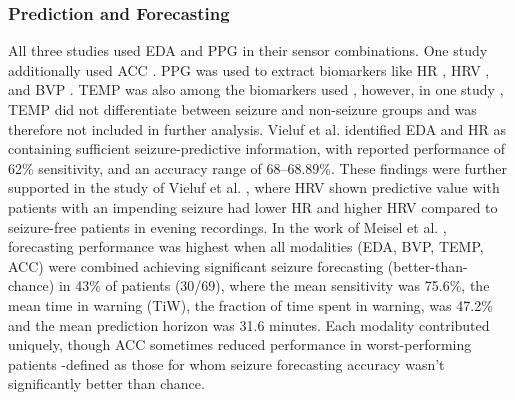 \subsubsection{Prediction and Forecasting}
All three studies used EDA and PPG in their sensor combinations. One study additionally used ACC \cite{Meisel2020-ii}. PPG was used to extract biomarkers like HR \cite{Vieluf2023-ta,Vieluf2023-zv}, HRV \cite{Vieluf2023-zv}, and BVP \cite{Meisel2020-ii}. TEMP was also among the biomarkers used \cite{Vieluf2023-zv,Meisel2020-ii}, however, in one study \cite{Vieluf2023-zv}, TEMP did not differentiate between seizure and non-seizure groups and was therefore not included in further analysis. Vieluf et al. \cite{Vieluf2023-ta,Vieluf2023-zv} identified EDA and HR as containing sufficient seizure-predictive information, with reported performance of 62\% sensitivity, and an accuracy range of 68–68.89\%. These findings were further supported in the study of Vieluf et al. \cite{Vieluf2023-zv} , where HRV shown predictive value with patients with an impending seizure had lower HR and higher HRV compared to seizure-free patients in evening recordings. In the work of Meisel et al. \cite{Meisel2020-ii},  forecasting performance was highest when all modalities (EDA, BVP, TEMP, ACC) were combined achieving significant seizure forecasting (better-than-chance) in 43\% of patients (30/69), where the mean sensitivity was 75.6\%, the mean time in warning (TiW), the fraction of time spent in warning,  was 47.2\% and the mean prediction horizon was 31.6 minutes. Each modality contributed uniquely, though ACC sometimes reduced performance in worst-performing  patients -defined as those for whom seizure forecasting accuracy wasn’t significantly better than chance.
